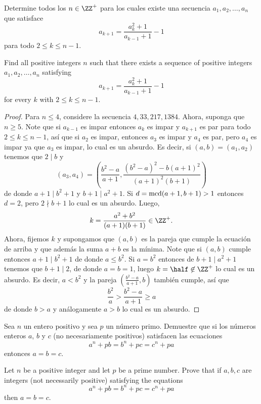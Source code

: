 \begin{probEG}[ISL 2009/N4]
	Determine todos los $n\in\ZZ^+$ para los cuales existe una secuencia $a_1,a_2,\dots,a_n$ que satisface
	\[a_{k+1}=\frac{a_k^2+1}{a_{k-1}+1}-1\]
	para todo $2\le k\le n-1$.
	\begin{hint}
		Find all positive integers $n$ such that there exists a sequence of positive integers $a_1,a_2,\dots,a_n$ satisfying
		\[a_{k+1}=\frac{a_k^2+1}{a_{k-1}+1}-1\]
		for every $k$ with $2\le k\le n-1$.
	\end{hint}
\end{probEG}

\begin{proof}
	Para $n\le 4$, considere la secuencia $4,33,217,1384$. Ahora, suponga que $n\ge 5$. Note que si $a_{k-1}$ es impar entonces $a_k$ es impar y $a_{k+1}$ es par para todo $2\le k\le n-1$, así que si $a_2$ es impar, entonces $a_3$ es impar y $a_4$ es par, pero $a_4$ es impar ya que $a_3$ es impar, lo cual es un absurdo. Es decir, si $(a,b)=(a_1,a_2)$ tenemos que $2\mid b$ y
	\[(a_3,a_4)=\left(\frac{b^2-a}{a+1},\frac{(b^2-a)^2-b(a+1)^2}{(a+1)^2(b+1)}\right)\]
	de donde $a+1\mid b^2+1$ y $b+1\mid a^2+1$. Si $d=\operatorname{mcd}(a+1,b+1)>1$ entonces $d=2$, pero $2\nmid b+1$ lo cual es un absurdo. Luego,
	\[k=\frac{a^2+b^2}{(a+1)(b+1)}\in\ZZ^+.\]
	Ahora, fijemos $k$ y supongamos que $(a,b)$ es la pareja que cumple la ecuación de arriba y que además la suma $a+b$ es la mínima. Note que si $(a,b)$ cumple entonces $a+1\mid b^2+1$ de donde $a\le b^2$. Si $a=b^2$ entonces de $b+1\mid a^2+1$ tenemos que $b+1\mid 2$, de donde $a=b=1$, luego $k=\half\not\in\ZZ^+$ lo cual es un absurdo. Es decir, $a<b^2$ y la pareja $\left(\frac{b^2-a}{a+1},b\right)$ también cumple, así que
	\[\frac{b^2}{a}>\frac{b^2-a}{a+1}\ge a\]
	de donde $b>a$ y análogamente $a>b$ lo cual es un absurdo.
\end{proof}

\begin{probEB}[ISL 2008/N1]
	Sea $n$ un entero positivo y sea $p$ un número primo. Demuestre que si los números enteros $a$, $b$ y $c$ (no necesariamente positivos) satisfacen las ecuaciones
	\[a^n+pb=b^n+pc=c^n+pa\]
	entonces $a=b=c$.
	\begin{hint}
		Let $n$ be a positive integer and let $p$ be a prime number. Prove that if $a,b,c$ are integers (not necessarily positive) satisfying the equations
		\[a^n+pb=b^n+pc=c^n+pa\]
		then $a=b=c$.
	\end{hint}
\end{probEB}

